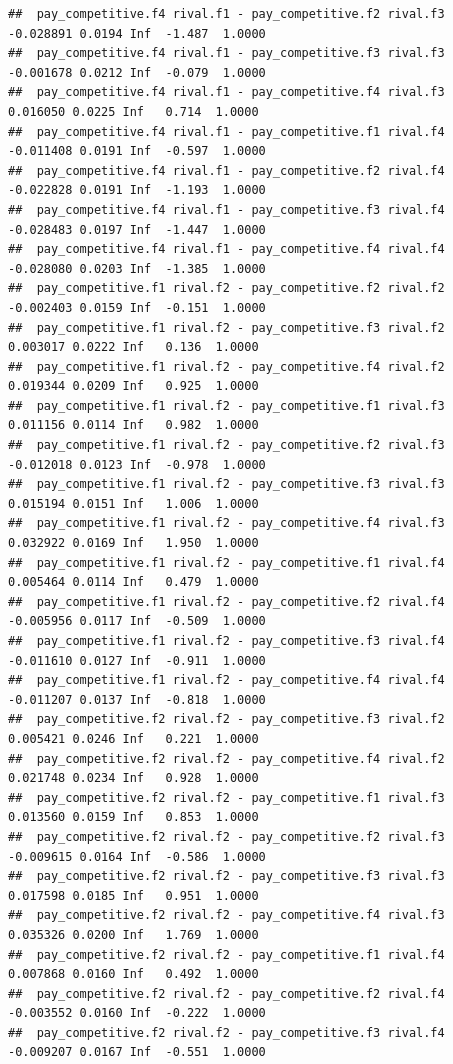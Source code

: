 \documentclass[
]{article}
\begin{document}
\begin{verbatim}
##  pay_competitive.f4 rival.f1 - pay_competitive.f2 rival.f3 -0.028891 0.0194 Inf  -1.487  1.0000
##  pay_competitive.f4 rival.f1 - pay_competitive.f3 rival.f3 -0.001678 0.0212 Inf  -0.079  1.0000
##  pay_competitive.f4 rival.f1 - pay_competitive.f4 rival.f3  0.016050 0.0225 Inf   0.714  1.0000
##  pay_competitive.f4 rival.f1 - pay_competitive.f1 rival.f4 -0.011408 0.0191 Inf  -0.597  1.0000
##  pay_competitive.f4 rival.f1 - pay_competitive.f2 rival.f4 -0.022828 0.0191 Inf  -1.193  1.0000
##  pay_competitive.f4 rival.f1 - pay_competitive.f3 rival.f4 -0.028483 0.0197 Inf  -1.447  1.0000
##  pay_competitive.f4 rival.f1 - pay_competitive.f4 rival.f4 -0.028080 0.0203 Inf  -1.385  1.0000
##  pay_competitive.f1 rival.f2 - pay_competitive.f2 rival.f2 -0.002403 0.0159 Inf  -0.151  1.0000
##  pay_competitive.f1 rival.f2 - pay_competitive.f3 rival.f2  0.003017 0.0222 Inf   0.136  1.0000
##  pay_competitive.f1 rival.f2 - pay_competitive.f4 rival.f2  0.019344 0.0209 Inf   0.925  1.0000
##  pay_competitive.f1 rival.f2 - pay_competitive.f1 rival.f3  0.011156 0.0114 Inf   0.982  1.0000
##  pay_competitive.f1 rival.f2 - pay_competitive.f2 rival.f3 -0.012018 0.0123 Inf  -0.978  1.0000
##  pay_competitive.f1 rival.f2 - pay_competitive.f3 rival.f3  0.015194 0.0151 Inf   1.006  1.0000
##  pay_competitive.f1 rival.f2 - pay_competitive.f4 rival.f3  0.032922 0.0169 Inf   1.950  1.0000
##  pay_competitive.f1 rival.f2 - pay_competitive.f1 rival.f4  0.005464 0.0114 Inf   0.479  1.0000
##  pay_competitive.f1 rival.f2 - pay_competitive.f2 rival.f4 -0.005956 0.0117 Inf  -0.509  1.0000
##  pay_competitive.f1 rival.f2 - pay_competitive.f3 rival.f4 -0.011610 0.0127 Inf  -0.911  1.0000
##  pay_competitive.f1 rival.f2 - pay_competitive.f4 rival.f4 -0.011207 0.0137 Inf  -0.818  1.0000
##  pay_competitive.f2 rival.f2 - pay_competitive.f3 rival.f2  0.005421 0.0246 Inf   0.221  1.0000
##  pay_competitive.f2 rival.f2 - pay_competitive.f4 rival.f2  0.021748 0.0234 Inf   0.928  1.0000
##  pay_competitive.f2 rival.f2 - pay_competitive.f1 rival.f3  0.013560 0.0159 Inf   0.853  1.0000
##  pay_competitive.f2 rival.f2 - pay_competitive.f2 rival.f3 -0.009615 0.0164 Inf  -0.586  1.0000
##  pay_competitive.f2 rival.f2 - pay_competitive.f3 rival.f3  0.017598 0.0185 Inf   0.951  1.0000
##  pay_competitive.f2 rival.f2 - pay_competitive.f4 rival.f3  0.035326 0.0200 Inf   1.769  1.0000
##  pay_competitive.f2 rival.f2 - pay_competitive.f1 rival.f4  0.007868 0.0160 Inf   0.492  1.0000
##  pay_competitive.f2 rival.f2 - pay_competitive.f2 rival.f4 -0.003552 0.0160 Inf  -0.222  1.0000
##  pay_competitive.f2 rival.f2 - pay_competitive.f3 rival.f4 -0.009207 0.0167 Inf  -0.551  1.0000

\end{verbatim}
\end{document}
